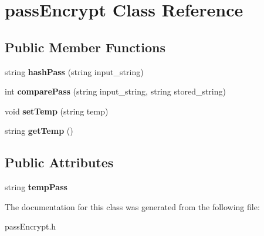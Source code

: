 \hypertarget{classpassEncrypt}{}\section{pass\+Encrypt Class Reference}
\label{classpassEncrypt}
\subsection*{Public Member Functions}
\begin{DoxyCompactItemize}
\item 
\mbox{\label{classpassEncrypt_adb2daeae895841636913256052184c3d}} 
string {\bfseries hash\+Pass} (string input\+\_\+string)
\item 
\mbox{\label{classpassEncrypt_afe01e3ca0ef024d069d0ae6faf5e7dff}} 
int {\bfseries compare\+Pass} (string input\+\_\+string, string stored\+\_\+string)
\item 
\mbox{\label{classpassEncrypt_a78473e3130e9928d0a55fd38e1b6fd59}} 
void {\bfseries set\+Temp} (string temp)
\item 
\mbox{\label{classpassEncrypt_a716876f7716a7892c3241dfbd38c41c2}} 
string {\bfseries get\+Temp} ()
\end{DoxyCompactItemize}
\subsection*{Public Attributes}
\begin{DoxyCompactItemize}
\item 
\mbox{\label{classpassEncrypt_a21399c0273569caa00741ae214f52bce}} 
string {\bfseries temp\+Pass}
\end{DoxyCompactItemize}


The documentation for this class was generated from the following file\+:\begin{DoxyCompactItemize}
\item 
pass\+Encrypt.\+h\end{DoxyCompactItemize}
